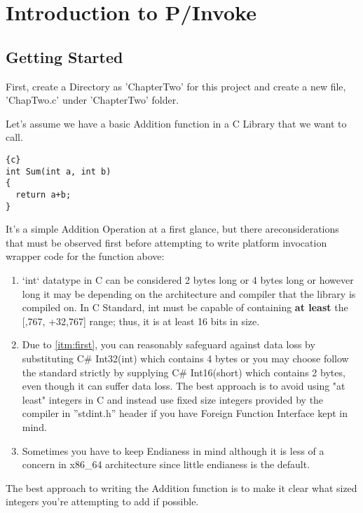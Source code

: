 \chapter{Introduction to P/Invoke}

\section{Getting Started}
First, create a Directory as 'ChapterTwo' for this project and create a new file, 'ChapTwo.c' under 'ChapterTwo' folder.

Let's assume we have a basic Addition function in a C Library that we want to call.

\begin{lstlisting}{c}
int Sum(int a, int b)
{
  return a+b;
}
\end{lstlisting}

It's a simple Addition Operation at a first glance, but there are\newline considerations that must be observed first before attempting to write platform invocation wrapper code for the function above:

\begin{enumerate}
	\item \label{itm:first} `int` datatype in C can be considered 2 bytes long or 4 bytes long or however long it may be depending on the architecture and compiler that the library is compiled on. In C Standard, int must be capable of containing \textbf{at least} the [,767, +32,767] range; thus, it is at least 16 bits in size.
	
	\item Due to \ref{itm:first}, you can reasonably safeguard against data loss by substituting C\# Int32(int) which contains 4 bytes or you may choose follow the standard strictly by supplying C\# Int16(short) which contains 2 bytes, even though it can suffer data loss. The best approach is to avoid using "at least" integers in C and instead use fixed size integers provided by the compiler in ''stdint.h'' header if you have Foreign Function Interface kept in mind.
	
	\item Sometimes you have to keep Endianess in mind although it is less of a concern in x86\_64 architecture since little endianess is the default.
\end{enumerate}
\newpage
The best approach to writing the Addition function is to make it clear what sized integers you're attempting to add  if possible.

